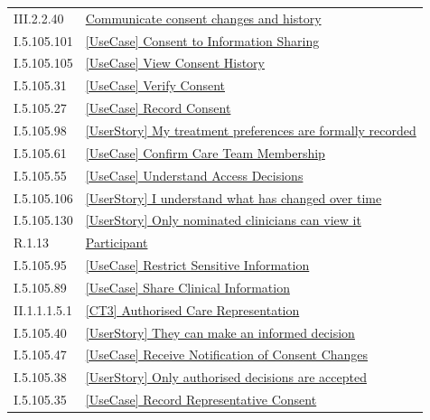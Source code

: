 \begin{longtable}{p{.22\linewidth}p{.73\linewidth}}
III.2.2.40 & \hyperref[element:9356b876f2aa427f989ad4f1b7f2fa4c]{Communicate consent changes and history} \\
I.5.105.101 & \hyperref[element:941201469e51412399ae1c1c7e2b21be]{[UseCase] Consent to Information Sharing} \\
I.5.105.105 & \hyperref[element:946db0fc796b41c09b9e8c1c640550a8]{[UseCase] View Consent History} \\
I.5.105.31 & \hyperref[element:94cf8f5d926c45069ad68eb71ecbdfcb]{[UseCase] Verify Consent} \\
I.5.105.27 & \hyperref[element:955f9f8f9e12434591401c84670abd5e]{[UseCase] Record Consent} \\
I.5.105.98 & \hyperref[element:96428ed622934c068899465e0a814a69]{[UserStory] My treatment preferences are formally recorded} \\
I.5.105.61 & \hyperref[element:9c37e5a5b96f492b87328078fa66a76a]{[UseCase] Confirm Care Team Membership} \\
I.5.105.55 & \hyperref[element:9fd2c08e3e164ed0b8be6c80ea7b5571]{[UseCase] Understand Access Decisions} \\
I.5.105.106 & \hyperref[element:a216c860a9244a07b4a691379c41d86b]{[UserStory] I understand what has changed over time} \\
I.5.105.130 & \hyperref[element:a2262082b2dd4eefaa5048c3b05f34c0]{[UserStory] Only nominated clinicians can view it} \\
R.1.13 & \hyperref[element:a3d1f5cc3e9b4d9eab326a5388445101]{Participant} \\
I.5.105.95 & \hyperref[element:a4a73ad13a8148d29a1b9c6bffe7121d]{[UseCase] Restrict Sensitive Information} \\
I.5.105.89 & \hyperref[element:a56186b0580849df93d3b97d76626641]{[UseCase] Share Clinical Information} \\
II.1.1.1.5.1 & \hyperref[element:a7092757af934517850ff63707397050]{[CT3] Authorised Care Representation} \\
I.5.105.40 & \hyperref[element:a8e1977ab72d41c587c83366e476ed50]{[UserStory] They can make an informed decision} \\
I.5.105.47 & \hyperref[element:a998328d2f414411bd197f119ec4e70e]{[UseCase] Receive Notification of Consent Changes} \\
I.5.105.38 & \hyperref[element:b19437ab28c04965ae2d9495449b7afa]{[UserStory] Only authorised decisions are accepted} \\
I.5.105.35 & \hyperref[element:b2a0dc71774745d593e2c686eca71bac]{[UseCase] Record Representative Consent} \\

\end{longtable}
